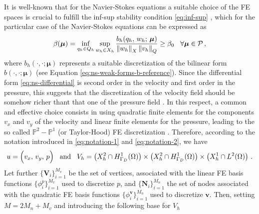 \documentclass[12pt, a4paper, twoside, openright]{report}
\numberwithin{equation}{chapter}
\theoremstyle{theorem}
\theoremstyle{definition}
\theoremstyle{remark}
\theoremstyle{proposition}
\numberwithin{figure}{chapter}
\newcommand{\norm}[1]{\left\lVert#1\right\rVert}
\newcommand{\bg}[1]{\boldsymbol{#1}}
\begin{document}
		It is well-known that for the Navier-Stokes equations a suitable choice of the FE spaces is crucial to fulfill the inf-sup stability condition \eqref{eq:inf-sup} \cite{Ran99}, which for the particular case of the Navier-Stokes equations can be expressed as
		\begin{equation}
			\label{eq:inf-sup-ns}
			\beta(\bg{\mu}) = \inf_{q_h \in Q_h} \sup_{w_h \in X_h} \dfrac{b_h(q_h, \, w_h; \, \bg{\mu})}{\norm{w_h}_X \norm{v_h}_Q} \geq \beta_0 \hspace*{0.3cm} \forall \bg{\mu} \in \mathcal{P} \, ,
		\end{equation}
		where $b_h(\cdot, \cdot; \bg{\mu})$ represents a suitable discretization of the bilinear form $b(\cdot, \cdot; \bg{\mu})$ (see Equation \eqref{eq:ns-weak-forms-b-reference}). Since the differential form \eqref{eq:ns-differential} is second order in the velocity and first order in the pressure, this suggests that the discretization of the velocity field should be somehow richer thant that one of the pressure field \cite{Qua10}. In this respect, a common and effective choice consists in using quadratic finite elements for the components $v_x$ and $v_y$ of the velocity and linear finite elements for the pressure, leading to the so called $\mathbb{P}^2 - \mathbb{P}^1$ (or Taylor-Hood) FE discretization \cite{Per02}. Therefore, according to the notation introduced in \eqref{eq:notation-1} and \eqref{eq:notation-2}, we have
		\begin{equation}
			\begin{aligned}
				u = \Big( v_x, \, v_y, \, p \Big) \hspace*{0.3cm} \text{and} \hspace*{0.3cm} V_h = \left( X_h^2 \cap H^1_{\Gamma_D}(\Omega) \right) \times \left( X_h^2 \cap H^1_{\Gamma_D}(\Omega) \right) \times \left( X_h^1 \cap L^2(\Omega) \right) \, .
			\end{aligned}
		\end{equation}
		Let further $\big\lbrace \bg{V}_i \big\rbrace_{i = 1}^{M_v}$ be the set of vertices, associated with the linear FE basis functions $\big\lbrace \phi_i^p \big\rbrace_{i = 1}^{M_v}$ used to discretize $p$, and $\big\lbrace \bg{N}_i \big\rbrace_{i = 1}^{M_n}$ the set of nodes associated with the quadratic FE basis functions $\big\lbrace \phi_i^{\bg{v}} \big\rbrace_{i = 1}^{M_n}$ used to discretize $\bg{v}$. Then, setting $M = 2 M_n +M_v$ and introducing the following base for $V_h$
\end{document}
